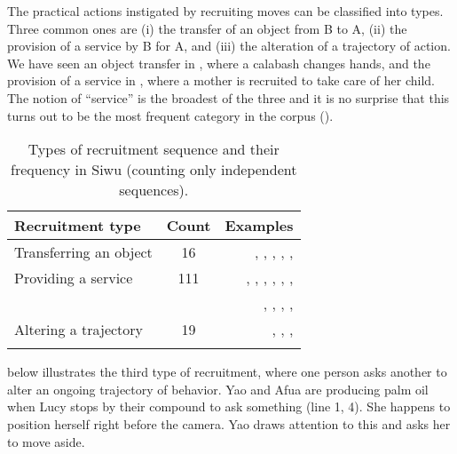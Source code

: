\documentclass[output=paper]{langsci/langscibook}
\begin{document}
The practical actions instigated by recruiting moves can be classified into types. Three common ones are (i) the transfer of an object from B to A, (ii) the provision of a service by B for A, and (iii) the alteration of a trajectory of action. We have seen an object transfer in  , where a calabash changes hands, and the provision of a service in  , where a mother is recruited to take care of her child. The notion of “service” is the broadest of the three and it is no surprise that this turns out to be the most frequent category in the corpus ().

\begin{table}
\begin{tabularx}{\textwidth}{XCr}
\lsptoprule
Recruitment type &  Count &  Examples\\
\midrule
Transferring an object & 16 &  ,  ,  ,  ,  ,  \\
Providing a service & 111 &  ,  ,  ,  ,  ,  ,\\ 
& & , ,  ,  ,  \\
Altering a trajectory & 19 &  ,  ,  ,  \\
\lspbottomrule
\end{tabularx}

\caption{Types of recruitment sequence and their frequency in Siwu (counting only independent sequences).}
\label{tab:dingemanse:2}
\end{table}

 below illustrates the third type of recruitment, where one person asks another to alter an ongoing trajectory of behavior. Yao and Afua are producing palm oil when Lucy stops by their compound to ask something (line 1, 4). She happens to position herself right before the camera. Yao draws attention to this and asks her to move aside.
\end{document}
